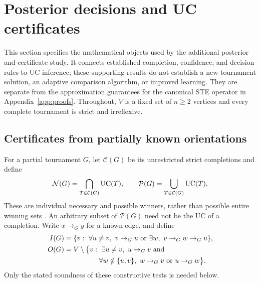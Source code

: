 \section{Posterior decisions and UC certificates}\label{app:posterior-certificates-theory}
This section specifies the mathematical objects used by the additional posterior and certificate study. It connects established completion, confidence, and decision rules to UC inference; these supporting results do not establish a new tournament solution, an adaptive comparison algorithm, or improved learning. They are separate from the approximation guarantees for the canonical STE operator in Appendix~\ref{app:proofs}. Throughout, $V$ is a fixed set of $n\ge2$ vertices and every complete tournament is strict and irreflexive.

\subsection{Certificates from partially known orientations}\label{app:uc-completion-certificates}
For a partial tournament $G$, let $\mathcal C(G)$ be its unrestricted strict completions and define
\[
\mathcal N(G)=\bigcap_{T\in\mathcal C(G)}\mathrm{UC}(T),\qquad
\mathcal P(G)=\bigcup_{T\in\mathcal C(G)}\mathrm{UC}(T).
\]
These are individual necessary and possible winners, rather than possible entire winning sets \citep{aziz2015partial}. An arbitrary subset of $\mathcal P(G)$ need not be the UC of a completion. Write $x\to_G y$ for a known edge, and define
\begin{align}
I(G)&=\{v:\ \forall u\ne v,\ v\to_Gu\ \text{or}\ \exists w,\ v\to_Gw\to_Gu\},\label{eq:uc-inner}\\
O(G)&=V\setminus\bigl\{v:\ \exists u\ne v,\ u\to_Gv\ \text{and}\notag\\
&\hspace{5em}\forall w\notin\{u,v\},\ w\to_Gv\ \text{or}\ u\to_Gw\bigr\}.\label{eq:uc-outer}
\end{align}
Only the stated soundness of these constructive tests is needed below.

